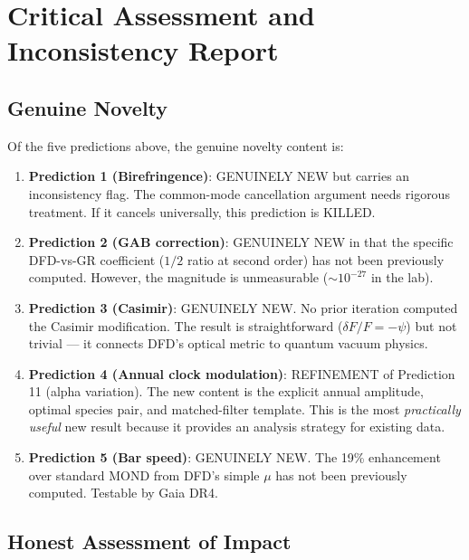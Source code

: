 \documentclass[11pt]{article}
\begin{document}
\section{Critical Assessment and Inconsistency Report}
\label{sec:assessment}

\subsection{Genuine Novelty}

Of the five predictions above, the genuine novelty content is:

\begin{enumerate}
\item \textbf{Prediction 1 (Birefringence)}: GENUINELY NEW but carries an inconsistency
flag. The common-mode cancellation argument needs rigorous treatment. If it cancels
universally, this prediction is KILLED.

\item \textbf{Prediction 2 (GAB correction)}: GENUINELY NEW in that the specific
DFD-vs-GR coefficient ($1/2$ ratio at second order) has not been previously computed.
However, the magnitude is unmeasurable ($\sim 10^{-27}$ in the lab).

\item \textbf{Prediction 3 (Casimir)}: GENUINELY NEW. No prior iteration computed
the Casimir modification. The result is straightforward ($\delta F/F = -\psi$) but
not trivial --- it connects DFD's optical metric to quantum vacuum physics.

\item \textbf{Prediction 4 (Annual clock modulation)}: REFINEMENT of Prediction 11
(alpha variation). The new content is the explicit annual amplitude, optimal species
pair, and matched-filter template. This is the most \emph{practically useful} new
result because it provides an analysis strategy for existing data.

\item \textbf{Prediction 5 (Bar speed)}: GENUINELY NEW. The 19\% enhancement over
standard MOND from DFD's simple $\mu$ has not been previously computed. Testable
by Gaia DR4.
\end{enumerate}

\subsection{Honest Assessment of Impact}
\end{document}
